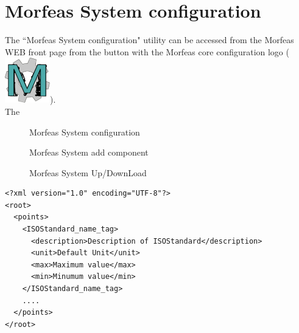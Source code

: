 \newpage
\section{Morfeas System configuration} \label{sys_conf}
The ``Morfeas System configuration" utility can be accessed from the Morfeas WEB front page from the button with the Morfeas core configuration logo
(\includegraphics[height=.150in]{../art/morfeas_gear.png}).\\

The 

\begin{figure}[h]
\centering
	\caption{Morfeas System configuration}
	\label{fig:Morfeas_sys_conf}
\end{figure}

\begin{figure}[h]
\centering
	\caption{Morfeas System add component}
	\label{fig:Morfeas_sys_conf_add_comp}
\end{figure}

\begin{figure}[h]
\centering
	\caption{Morfeas System Up/DownLoad}
	\label{fig:sys_conf_up_down}
\end{figure}

\begin{lstlisting}[frame=single,caption=Structure of ISOstandard file,label=lst:ISOStandard]
<?xml version="1.0" encoding="UTF-8"?>
<root>
  <points>
    <ISOStandard_name_tag>
      <description>Description of ISOStandard</description>
      <unit>Default Unit</unit>
      <max>Maximum value</max>
      <min>Minumum value</min>
    </ISOStandard_name_tag>
    ....
  </points>
</root>
\end{lstlisting}